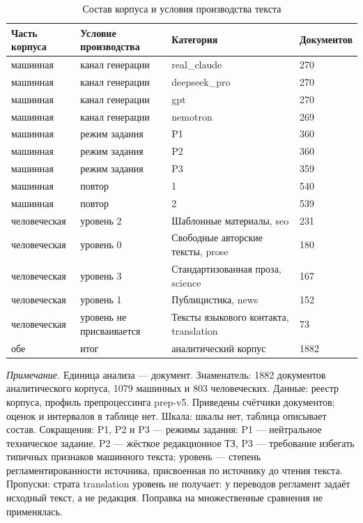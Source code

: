 \begin{table}[htbp]
\centering
\small
\caption{Состав корпуса и условия производства текста}
\label{tab:1}
\begin{tabular}{llll}
\toprule
Часть корпуса & Условие производства & Категория & Документов \\
\midrule
машинная & канал генерации & real\_claude & 270 \\
машинная & канал генерации & deepseek\_pro & 270 \\
машинная & канал генерации & gpt & 270 \\
машинная & канал генерации & nemotron & 269 \\
машинная & режим задания & P1 & 360 \\
машинная & режим задания & P2 & 360 \\
машинная & режим задания & P3 & 359 \\
машинная & повтор & 1 & 540 \\
машинная & повтор & 2 & 539 \\
человеческая & уровень 2 & Шаблонные материалы, seo & 231 \\
человеческая & уровень 0 & Свободные авторские тексты, prose & 180 \\
человеческая & уровень 3 & Стандартизованная проза, science & 167 \\
человеческая & уровень 1 & Публицистика, news & 152 \\
человеческая & уровень не присваивается & Тексты языкового контакта, translation & 73 \\
обе & итог & аналитический корпус & 1882 \\
\bottomrule
\end{tabular}
\begin{minipage}{\linewidth}\footnotesize\vspace{2pt}
\textit{Примечание.} Единица анализа — документ. Знаменатель: 1882 документов аналитического корпуса, 1079 машинных и 803 человеческих. Данные: реестр корпуса, профиль препроцессинга prep-v5. Приведены счётчики документов; оценок и интервалов в таблице нет. Шкала: шкалы нет, таблица описывает состав. Сокращения: P1, P2 и P3 — режимы задания: P1 — нейтральное техническое задание, P2 — жёсткое редакционное ТЗ, P3 — требование избегать типичных признаков машинного текста; уровень — степень регламентированности источника, присвоенная по источнику до чтения текста. Пропуски: страта translation уровень не получает: у переводов регламент задаёт исходный текст, а не редакция. Поправка на множественные сравнения не применялась.
\end{minipage}
\end{table}
